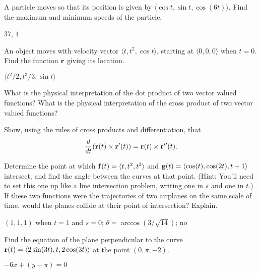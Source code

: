 \begin{enumialphparenastyle}
\begin{ex}
A particle moves so that its position is given by
$\langle \cos t, \sin t, \cos(6t)\rangle$. Find the maximum and
minimum speeds of the particle.
\begin{sol} $37$, $1$
\end{sol}
\end{ex}

\begin{ex}
An object moves with velocity vector $\langle t, t^2,
\cos t\rangle$, starting at $\langle 0,0,0\rangle$ when $t=0$.
 Find the function
${\bf r}$ giving its location.
\begin{sol} $\langle t^2/2,t^3/3,\sin t\rangle$
\end{sol}
\end{ex}

\begin{ex}
What is the physical interpretation of the dot product of two
  vector valued functions?  What is the physical interpretation of the
  cross product of two vector valued functions?
\end{ex}

\begin{ex}
Show, using the rules of cross products and differentiation,
  that
$${d\over dt} ({\bf r}(t) \times {\bf r}'(t))= 
{\bf r}(t) \times {\bf r}''(t).$$
\end{ex}

\begin{ex}
Determine the point at which ${\bf f}(t)=\langle t, t^2, t^3
\rangle$ and ${\bf g}(t) =\langle \cos(t), \cos(2t), t+1 \rangle$
intersect, and find the angle between the curves at that point.  (Hint:
You'll need to set this one up like a line intersection problem,
writing one in $s$ and one in $t$.) If these two functions were the
trajectories of two airplanes on the same scale of time, would the
planes collide at their point of intersection?  Explain.
\begin{sol} $(1,1,1)$ when $t=1$ and $s=0$; $\theta=\arccos(3/\sqrt{14})$; no
\end{sol}
\end{ex}

\begin{ex}
Find the equation of the plane perpendicular to the curve ${\bf r}(t)
 = \langle 2\sin(3t),t,2\cos(3t)\rangle$ at the point $(0,\pi,-2)$.
\begin{sol} $-6x+(y-\pi)=0$
\end{sol}
\end{ex}


\end{enumialphparenastyle}

